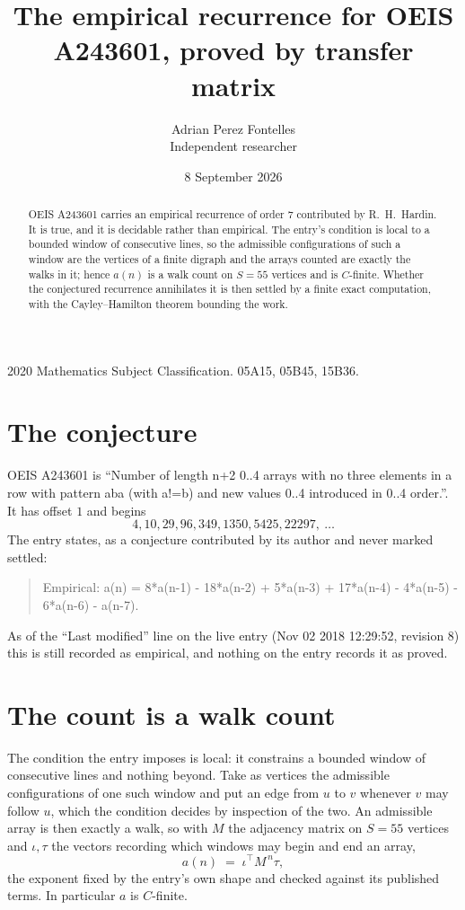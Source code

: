 \documentclass[11pt,a4paper]{article}
\title{The empirical recurrence for OEIS A243601, proved by transfer matrix}
\author{Adrian Perez Fontelles\\ \small Independent researcher}
\date{8 September 2026}
\theoremstyle{plain}
\theoremstyle{definition}
\begin{document}
\maketitle

\begin{abstract}
OEIS A243601 carries an empirical recurrence of order $7$ contributed by R.~H.~Hardin. It is
true, and it is decidable rather than empirical. The entry's condition is local to a bounded window of consecutive lines, so
the admissible configurations of such a window are the vertices of a finite digraph and the
arrays counted are exactly the walks in it; hence $a(n)$ is a walk count on $S=55$ vertices
and is $C$-finite. Whether the conjectured recurrence annihilates it is then settled by a
finite exact computation, with the Cayley--Hamilton theorem bounding the work.
\end{abstract}

\noindent\small 2020 Mathematics Subject Classification. 05A15, 05B45, 15B36.\normalsize

\section{The conjecture}

OEIS A243601 is ``Number of length n+2 0..4 arrays with no three elements in a row with pattern aba (with a!=b) and new values 0..4 introduced in 0..4 order.''. It has offset $1$ and begins
\[
4, 10, 29, 96, 349, 1350, 5425, 22297,\ \dots
\]
The entry states, as a conjecture contributed by its author and never marked settled:
\begin{quote}
Empirical: a(n) = 8*a(n-1) - 18*a(n-2) + 5*a(n-3) + 17*a(n-4) - 4*a(n-5) - 6*a(n-6) - a(n-7).
\end{quote}
As of the ``Last modified'' line on the live entry (Nov 02 2018 12:29:52, revision 8) this is still
recorded as empirical, and nothing on the entry records it as proved.

\section{The count is a walk count}

The condition the entry imposes is local: it constrains a bounded window of consecutive lines and nothing beyond. Take as
vertices the admissible configurations of one such window and put an edge from $u$ to $v$
whenever $v$ may follow $u$, which the condition decides by inspection of the two. An
admissible array is then exactly a walk, so with $M$ the adjacency matrix on $S=55$ vertices
and $\iota,\tau$ the vectors recording which windows may begin and end an array,
\[
a(n)\;=\;\iota^{\!\top}M^{\,n}\tau ,
\]
the exponent fixed by the entry's own shape and checked against its published terms. In
particular $a$ is $C$-finite.
\end{document}
